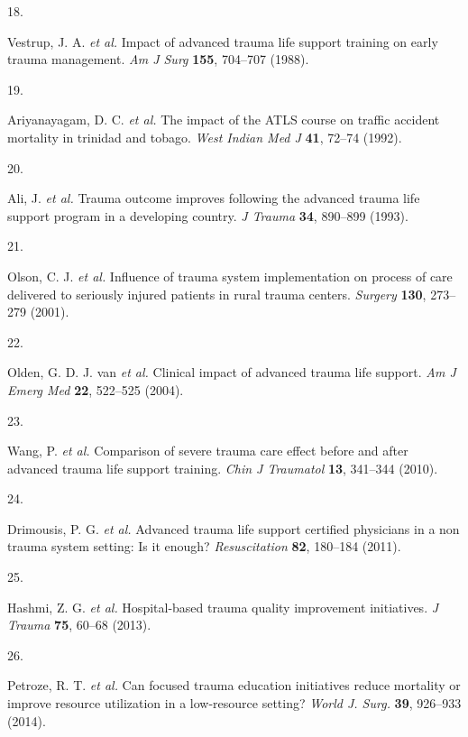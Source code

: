 \documentclass[
]{scrartcl}
\newlength{\cslhangindent}
\newlength{\csllabelwidth}
\newlength{\cslentryspacingunit} %
\newenvironment{CSLReferences}[2] %
 {%
  \setlength{\parindent}{0pt}
  \ifodd #1
  \let\oldpar\par
  \def\par{\hangindent=\cslhangindent\oldpar}
  \fi
  \setlength{\parskip}{#2\cslentryspacingunit}
 }%
 {}
\newcommand{\CSLLeftMargin}[1]{\parbox[t]{\csllabelwidth}{#1}}
\newcommand{\CSLRightInline}[1]{\parbox[t]{\linewidth - \csllabelwidth}{#1}\break}
\begin{document}
\begin{CSLReferences}{0}{0}
\leavevmode{}%
\CSLLeftMargin{18. }%
\CSLRightInline{Vestrup, J. A. \emph{et al.} Impact of advanced trauma
life support training on early trauma management. \emph{Am J Surg}
\textbf{155}, 704--707 (1988).}

\leavevmode{}%
\CSLLeftMargin{19. }%
\CSLRightInline{Ariyanayagam, D. C. \emph{et al.} The impact of the ATLS
course on traffic accident mortality in trinidad and tobago. \emph{West
Indian Med J} \textbf{41}, 72--74 (1992).}

\leavevmode{}%
\CSLLeftMargin{20. }%
\CSLRightInline{Ali, J. \emph{et al.} Trauma outcome improves following
the advanced trauma life support program in a developing country.
\emph{J Trauma} \textbf{34}, 890--899 (1993).}

\leavevmode{}%
\CSLLeftMargin{21. }%
\CSLRightInline{Olson, C. J. \emph{et al.} Influence of trauma system
implementation on process of care delivered to seriously injured
patients in rural trauma centers. \emph{Surgery} \textbf{130}, 273--279
(2001).}

\leavevmode{}%
\CSLLeftMargin{22. }%
\CSLRightInline{Olden, G. D. J. van \emph{et al.} Clinical impact of
advanced trauma life support. \emph{Am J Emerg Med} \textbf{22},
522--525 (2004).}

\leavevmode{}%
\CSLLeftMargin{23. }%
\CSLRightInline{Wang, P. \emph{et al.} Comparison of severe trauma care
effect before and after advanced trauma life support training.
\emph{Chin J Traumatol} \textbf{13}, 341--344 (2010).}

\leavevmode{}%
\CSLLeftMargin{24. }%
\CSLRightInline{Drimousis, P. G. \emph{et al.} Advanced trauma life
support certified physicians in a non trauma system setting: Is it
enough? \emph{Resuscitation} \textbf{82}, 180--184 (2011).}

\leavevmode{}%
\CSLLeftMargin{25. }%
\CSLRightInline{Hashmi, Z. G. \emph{et al.} Hospital-based trauma
quality improvement initiatives. \emph{J Trauma} \textbf{75}, 60--68
(2013).}

\leavevmode{}%
\CSLLeftMargin{26. }%
\CSLRightInline{Petroze, R. T. \emph{et al.} Can focused trauma
education initiatives reduce mortality or improve resource utilization
in a low-resource setting? \emph{World J. Surg.} \textbf{39}, 926--933
(2014).}


\end{CSLReferences}
\end{document}
